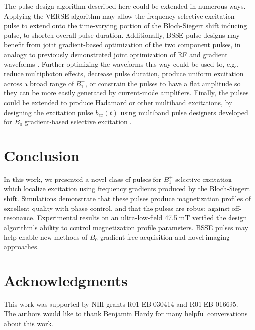 \documentclass[a4paper,12pt]{article}
\begin{document}
\par The pulse design algorithm described here could be extended in numerous ways.
Applying the VERSE algorithm \cite{Hargreaves2004Variable-rateSequences} may allow the frequency-selective excitation pulse to extend onto the time-varying portion of the Bloch-Siegert shift inducing pulse, 
to shorten overall pulse duration. 
Additionally, BSSE pulse designs may benefit from joint gradient-based optimization of the two component pulses, 
in analogy to previously demonstrated joint optimization of RF and gradient waveforms \cite{Luo2020JointMRI}.
Further optimizing the waveforms this way could be used to, e.g., 
reduce multiphoton effects, decrease pulse duration, produce uniform excitation across a broad range of $B_1^+$,
or constrain the pulses to have a flat amplitude so they can be more easily generated by 
current-mode amplifiers. %
Finally, the pulses could be extended to produce Hadamard or other multiband excitations,
by designing the excitation pulse $b_{ex}(t)$ using multiband pulse designers developed
for $B_0$ gradient-based selective excitation \cite{ Cunningham1999MethodTransform, Sharma2016Root-flippedPulses, Ma2017MinimumImaging}.

\section*{Conclusion}
In this work, we presented a novel class of pulses for $B_1^+$-selective excitation which localize excitation using frequency gradients produced by the Bloch-Siegert shift. Simulations demonstrate that these pulses produce magnetization profiles of excellent quality with phase control, and that the pulses are robust against off-resonance. Experimental results on an ultra-low-field 47.5 mT verified the design algorithm's ability to control magnetization profile parameters. BSSE pulses may help enable new methods of $B_0$-gradient-free acquisition and novel imaging approaches. 

\section*{Acknowledgments}
This work was supported by NIH grants R01 EB 030414 and R01 EB 016695. The authors would like to thank Benjamin Hardy for many helpful conversations about this work.
\end{document}
